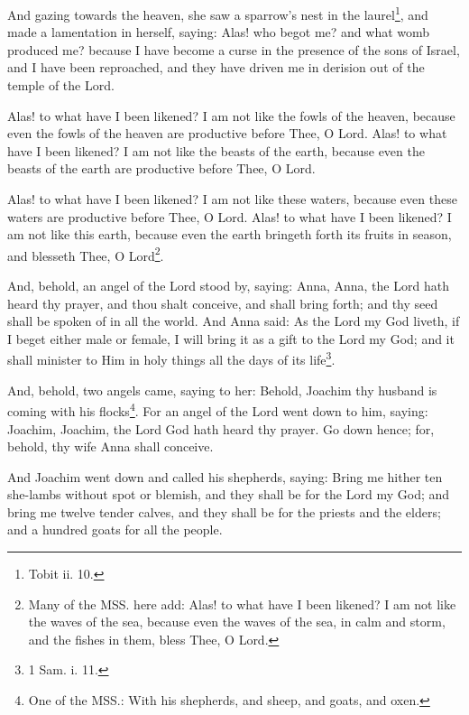 \documentclass[12pt]{book} %
\begin{document}
\begin{pairs}
\begin{Rightside}
\pend\pstart
{}

\pend\pstart
And gazing towards the heaven, she saw a sparrow's nest in the laurel\footnote{Tobit ii. 10.}, and made a lamentation in herself, saying: Alas! who begot me? and what womb produced me? because I have become a curse in the presence of the sons of Israel, and I have been reproached, and they have driven me in derision out of the temple of the Lord.

\pend\pstart
Alas! to what have I been likened? I am not like the fowls of the heaven, because even the fowls of the heaven are productive before Thee, O Lord. Alas! to what have I been likened? I am not like the beasts of the earth, because even the beasts of the earth are productive before Thee, O Lord.

\pend\pstart
Alas! to what have I been likened? I am not like these waters, because even these waters are productive before Thee, O Lord. Alas! to what have I been likened? I am not like this earth, because even the earth bringeth forth its fruits in season, and blesseth Thee, O Lord\footnote{Many of the MSS. here add: Alas! to what have I been likened? I am not like the waves of the sea, because even the waves of the sea, in calm and storm, and the fishes in them, bless Thee, O Lord.}.

\pend\pstart
{}

\pend\pstart
And, behold, an angel of the Lord stood by, saying: Anna, Anna, the Lord hath heard thy prayer, and thou shalt conceive, and shall bring forth; and thy seed shall be spoken of in all the world. And Anna said: As the Lord my God liveth, if I beget either male or female, I will bring it as a gift to the Lord my God; and it shall minister to Him in holy things all the days of its life\footnote{1 Sam. i. 11.}.

\pend\pstart
And, behold, two angels came, saying to her: Behold, Joachim thy husband is coming with his
flocks\footnote{One of the MSS.: With his shepherds, and sheep, and goats, and oxen.}. For an angel of the Lord went down to him, saying: Joachim, Joachim, the Lord God hath heard thy prayer. Go down hence; for, behold, thy wife Anna shall conceive.

\pend\pstart
And Joachim went down and called his shepherds, saying: Bring me hither ten she-lambs without spot or blemish, and they shall be for the Lord my God; and bring me twelve tender calves, and they shall be for the priests and the elders; and a hundred goats for all the people.


\end{Rightside}
\end{pairs}
\end{document}
